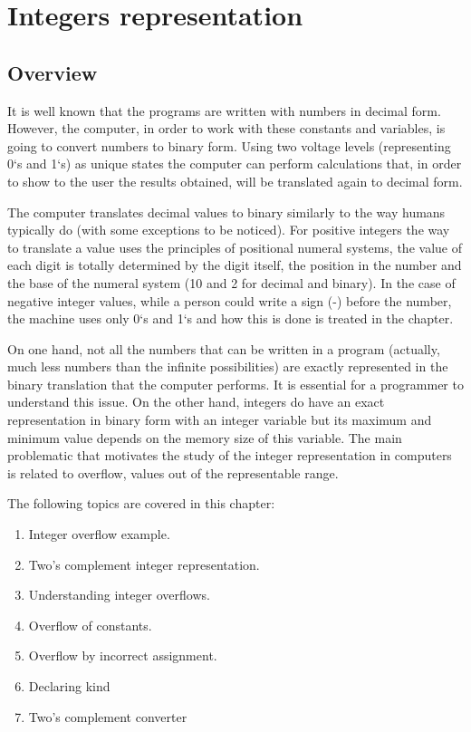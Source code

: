  \renewcommand\home{./Fortran/sources/IEEE}

\chapter{Integers representation} 

    \section*{Overview} 
    
It is well known that the programs are written with numbers in decimal form. However, the computer, 
in order to work with these constants and variables, is going to convert numbers to binary form. 
Using two voltage levels (representing 0`s and 1`s) as unique states the computer can perform calculations that, 
in order to show to the user the results obtained, will be translated again to decimal form. 

The computer translates decimal values to binary similarly to the way humans typically do (with some exceptions to be noticed). For 
positive integers the way to translate a value uses the principles of positional numeral systems, the value of each digit is totally determined by the 
digit itself, the position in the number and the base of the numeral system (10 and 2 for decimal and binary). In the case of negative integer values, 
while a person could write a sign (-) before the number, the machine uses only 0`s and 1`s and how this is done is treated in the chapter.

On one hand, not all the numbers that can be written in a program (actually, 
much less numbers than the infinite possibilities) are exactly represented 
in the binary translation that the computer performs. It is
essential for a programmer to understand this issue.
On the other hand, integers do have an exact representation in binary form 
with an integer variable  
but its maximum and minimum value depends on the memory size of this variable.  
The main problematic that motivates the study of the integer representation in 
computers is related to overflow, values out of the representable range. 

The following topics are covered in this chapter: 

\begin{enumerate} 
\setlength\itemsep{-0.1cm}
    \item Integer overflow example.
    \item Two's complement integer representation.
    \item Understanding integer overflows.
    \item Overflow of constants.
    \item Overflow by incorrect assignment.
    \item Declaring kind
    \item Two's complement converter
\end{enumerate} 
    
